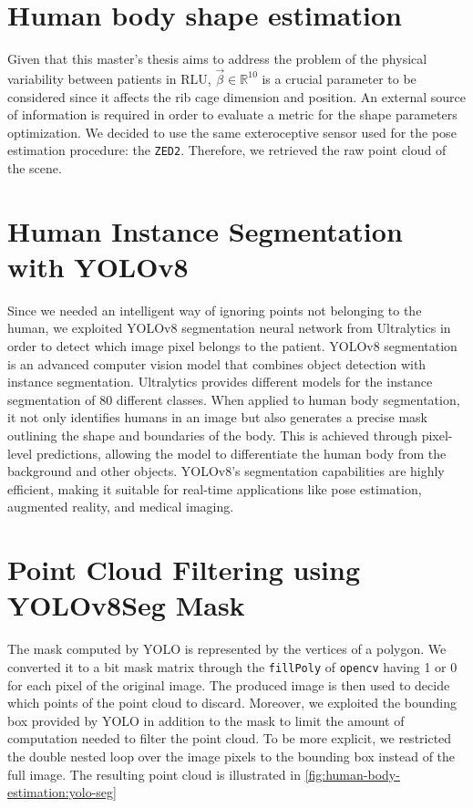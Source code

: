 \section{Human body shape estimation}
\label{section:human-body-shape-estimation}
Given that this master's thesis aims to address the problem of the physical variability between patients in RLU, $\vec{\beta} \in \mathbb{R}^{10}$ is a crucial parameter to be considered since it affects the rib cage dimension and position. An external source of information is required in order to evaluate a metric for the shape parameters optimization. We decided to use the same exteroceptive sensor used for the pose estimation procedure: the \verb|ZED2|. Therefore, we retrieved the raw point cloud of the scene. 

\section{Human Instance Segmentation with YOLOv8}
Since we needed an intelligent way of ignoring points not belonging to the human, we exploited YOLOv8\cite{jocher2023yolov8} segmentation neural network from Ultralytics in order to detect which image pixel belongs to the patient. YOLOv8 segmentation is an advanced computer vision model that combines object detection with instance segmentation. Ultralytics provides different models for the instance segmentation of 80 different classes. 
When applied to human body segmentation, it not only identifies humans in an image but also generates a precise mask outlining the shape and boundaries of the body. This is achieved through pixel-level predictions, allowing the model to differentiate the human body from the background and other objects. YOLOv8's segmentation capabilities are highly efficient, making it suitable for real-time applications like pose estimation, augmented reality, and medical imaging.  

\section{Point Cloud Filtering using YOLOv8Seg Mask}
The mask computed by YOLO is represented by the vertices of a polygon. We converted it to a bit mask matrix through the \verb|fillPoly| of \verb|opencv| having 1 or 0 for each pixel of the original image. The produced image is then used to decide which points of the point cloud to discard. Moreover, we exploited the bounding box provided by YOLO in addition to the mask to limit the amount of computation needed to filter the point cloud. To be more explicit, we restricted the double nested loop over the image pixels to the bounding box instead of the full image. The resulting point cloud is illustrated in \autoref{fig:human-body-estimation:yolo-seg}


